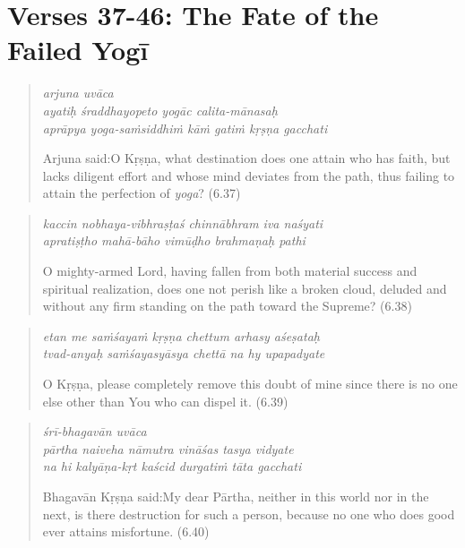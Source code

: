 \documentclass[12pt, twoside, openright]{memoir}
\begin{document}
\section{Verses 37-46: The Fate of the Failed Yogī}\label{sec-verses-37-46-the-fate-of-the-failed-yogi}


\par
\begin{verse}
\textit{arjuna uvāca} \\
\textit{ayatiḥ śraddhayopeto yogāc calita-mānasaḥ} \\
\textit{aprāpya yoga-saṁsiddhiṁ kāṁ gatiṁ kṛṣṇa gacchati}

\noindent \quad Arjuna said:\linebreak O Kṛṣṇa, what destination does one attain who has faith, but lacks diligent effort and whose mind deviates from the path, thus failing to attain the perfection of \textit{yoga}? (6.37)
\end{verse}
\par



\par
\begin{verse}
\textit{kaccin nobhaya-vibhraṣṭaś chinnābhram iva naśyati} \\
\textit{apratiṣṭho mahā-bāho vimūḍho brahmaṇaḥ pathi}

\noindent O mighty-armed Lord, having fallen from both material success and spiritual realization, does one not perish like a broken cloud, deluded and without any firm standing on the path toward the Supreme? (6.38)
\end{verse}
\par



\par
\begin{verse}
\textit{etan me saṁśayaṁ kṛṣṇa chettum arhasy aśeṣataḥ} \\
\textit{tvad-anyaḥ saṁśayasyāsya chettā na hy upapadyate}

\noindent O Kṛṣṇa, please completely remove this doubt of mine since there is no one else other than You who can dispel it. (6.39)
\end{verse}
\par



\par
\begin{verse}
\textit{śrī-bhagavān uvāca} \\
\textit{pārtha naiveha nāmutra vināśas tasya vidyate} \\
\textit{na hi kalyāṇa-kṛt kaścid durgatiṁ tāta gacchati}

\noindent \quad Bhagavān Kṛṣṇa said:\linebreak My dear Pārtha, neither in this world nor in the next, is there destruction for such a person, because no one who does good ever attains misfortune. (6.40)
\end{verse}
\par
\end{document}
